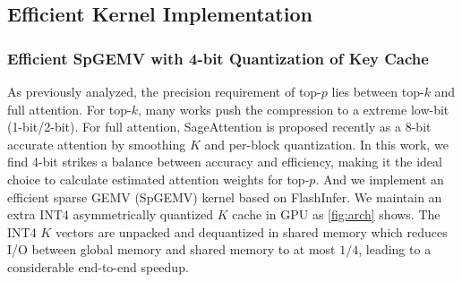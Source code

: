 

\subsection{Efficient Kernel Implementation\label{sec:kernel}}

\subsubsection{Efficient SpGEMV with 4-bit Quantization of Key Cache}

As previously analyzed, the precision requirement of top-$p$ lies between top-$k$ and full attention. For top-$k$, many works \cite{yang2024post, zhang2024pqcache} push the compression to a extreme low-bit (1-bit/2-bit). For full attention, SageAttention \cite{zhang2025sageattention} is proposed recently as a 8-bit accurate attention by smoothing $K$ and per-block quantization. In this work, we find 4-bit strikes a balance between accuracy and efficiency, making it the ideal choice to calculate estimated attention weights for top-$p$. And we implement an efficient sparse GEMV (SpGEMV) kernel based on FlashInfer.
We maintain an extra INT4 asymmetrically quantized $K$ cache in GPU as \autoref{fig:arch} shows. The INT4 $K$ vectors are unpacked and dequantized in shared memory which reduces I/O between global memory and shared memory to at most $1/4$, leading to a considerable end-to-end speedup.

